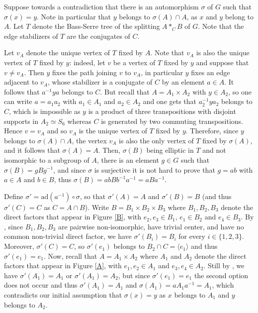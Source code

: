 \documentclass[a4paper, 11pt]{amsart}
\theoremstyle{definition}
\theoremstyle{remark}
\begin{document}
Suppose towards a contradiction that there is an automorphism $\sigma$ of $G$ such that $\sigma(x)=y$. Note in particular that $y$ belongs to $\sigma(A)\cap A$, as $x$ and $y$ belong to $A$. Let $T$ denote the Bass-Serre tree of the splitting $A\ast_C B$ of $G$. Note that the edge stabilizers of $T$ are the conjugates of $C$. 

\smallskip \noindent
Let $v_A$ denote the unique vertex of $T$ fixed by $A$. Note that $v_A$ is also the unique vertex of $T$ fixed by $y$: indeed, let $v$ be a vertex of $T$ fixed by $y$ and suppose that $v\neq v_A$. Then $y$ fixes the path joining $v$ to $v_A$, in particular $y$ fixes an edge adjacent to $v_A$, whose stabilizer is a conjugate of $C$ by an element $a\in A$. It follows that $a^{-1}ya$ belongs to $C$. But recall that $A=A_1\times A_2$ with $y\in A_2$, so one can write $a=a_1a_2$ with $a_1\in A_1$ and $a_2\in A_2$ and one gets that $a_2^{-1}ya_2$ belongs to $C$, which is impossible as $y$ is a product of three transpositions with disjoint supports in $A_2\simeq S_6$ whereas $C$ is generated by two commuting transpositions. Hence $v=v_A$ and so $v_A$ is the unique vertex of $T$ fixed by $y$. Therefore, since $y$ belongs to $\sigma(A)\cap A$, the vertex $v_A$ is also the only vertex of $T$ fixed by $\sigma(A)$, and it follows that $\sigma(A)=A$. Then, $\sigma(B)$ being elliptic in $T$ and not isomorphic to a subgroup of $A$, there is an element $g\in G$ such that $\sigma(B)=gBg^{-1}$, and since $\sigma$ is surjective it is not hard to prove that $g=ab$ with $a\in A$ and $b\in B$, thus $\sigma(B)=abBb^{-1}a^{-1}=aBa^{-1}$. 

\smallskip \noindent
Define $\sigma'=\mathrm{ad}(a^{-1})\circ \sigma$, so that $\sigma'(A)=A$ and $\sigma'(B)=B$ (and thus $\sigma'(C)=C$ as $C=A\cap B$). Write $B=B_1\times B_2\times B_3$ where $B_1,B_2,B_3$ denote the direct factors that appear in Figure \ref{B}, with $e_2,e_3\in B_1$, $e_1\in B_2$ and $e_4\in B_3$. By \cite{Bidwell,Bidwell2}, since $B_1,B_2,B_3$ are pairwise non-isomorphic, have trivial center, and have no common non-trivial direct factor, we have $\sigma'(B_i)=B_i$ for every $i\in\lbrace 1,2,3\rbrace$. Moreover, $\sigma'(C)=C$, so $\sigma'(e_1)$ belongs to $B_2\cap C=\langle e_1\rangle$ and thus $\sigma'(e_1)=e_1$. Now, recall that $A=A_1\times A_2$ where $A_1$ and $A_2$ denote the direct factors that appear in Figure \ref{A}, with $e_1,e_2\in A_1$ and $e_3,e_4\in A_2$. Still by \cite{Bidwell,Bidwell2}, we have $\sigma'(A_1)=A_1$ or $\sigma'(A_1)=A_2$, but since $\sigma'(e_1)=e_1$ the second option does not occur and thus $\sigma'(A_1)=A_1$ and $\sigma(A_1)=aA_1a^{-1}=A_1$, which contradicts our initial assumption that $\sigma(x)=y$ as $x$ belongs to $A_1$ and $y$ belongs to $A_2$.
\end{document}
